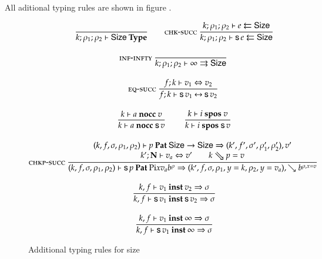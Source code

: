 All aditional typing rules are shown in figure \cite{str}.
\begin{figure}[p]
\begin{gather*}
\nru{}{}{\IsType{k}{\rho_1}{\rho_2}{\Size}}
\qquad
\nru{\chksucc}
{\Check{k}{\rho_1}{\rho_2}{e}{\Size}}
{\Check{k}{\rho_1}{\rho_2}{\s e}{\Size}} 
\\[2ex]
\nru{\infinfty}{}{\Infer{k}{\rho_1}{\rho_2}{\infty}{\Size}} 
\\[2ex]
\nru{\eqsuc}
{\EqVal{f}{k}{v_1}{v_2}}
{\FeqVal{f}{k}{\s v_1}{\s v_2}}
\\[2ex]
\nru{}
{\nocc{k}{a}{v}}
{\nocc{k}{a}{\s v}}
\qquad
\nru{}
{\spos{k}{i}{v}}
{\spos{k}{i}{\s v}}
\\[2ex]
\ndru{\chkpsucc}
{
\checkp{k,f,\sigma,\rho_1,\rho_2}{p}{\Size \ra \Size}
{k',f',\sigma',\rho'_1,\rho'_2}{v'}}
{
\EqVal{k'}{\nF}{v_a}{v'} \qquad
\ptv{k}{p} = v
}
{
\checkp
{k,f,\sigma,\rho_1,\rho_2}
{\s p}
{\vpi x v_a \cl{b}{\rho}}
{k',f,\sigma,\ins{\rho_1}{y}{k},\ins{\rho_2}{y}{v_a}}
{\wh \cl{b}{\ins{\rho}{x}{v}}}}
\\[2ex]
\nru{}
{\unify{k}{f}{v_1}{v_2}{\sigma}}
{\unify{k}{f}{\s v_1}{\s v_2}{\sigma}
}
\\[2ex]
\nru{}
{\unify{k}{f}{v_1}{\infty}{\sigma}}
{\unify{k}{f}{\s v_1}{\infty}{\sigma}
}
\end{gather*}
\label{str}
\caption{Additional typing rules for size}
\end{figure}

